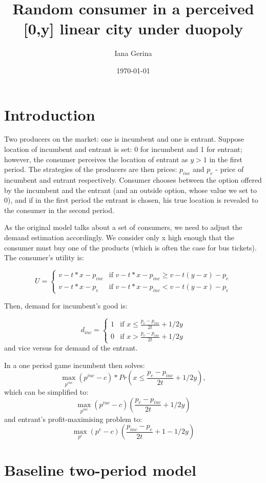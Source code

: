 \documentclass{article}
\title{Random consumer in a perceived [0,y] linear city under duopoly}
\author{Iana Gerina}
\date{\today}
\begin{document}
\maketitle


\section{Introduction}
Two producers on the market: one is incumbent and one is entrant. Suppose location of incumbent and entrant is set: 0 for incumbent and 1 for entrant; however, the consumer perceives the location of entrant as $y>1$ in the first period. The strategies of the producers are then prices: $p_{inc}$ and $p_{e}$ - price of incumbent and entrant respectively. Consumer chooses between the option offered by the incumbent and the entrant (and an outside option, whose value we set to 0), and if in the first period the entrant is chosen, his true location is revealed to the consumer in the second period.

As the original model talks about a set of consumers, we need to adjust the demand estimation accordingly. We consider only x high enough that the consumer must buy one of the products (which is often the case for bus tickets). The consumer's utility is:

    $$ U = \begin{cases}
    v - t*x - p_{inc} &  \text{if } v-t*x - p_{inc} \geq v - t(y-x) - p_{e}\\
    v - t*x - p_{e} &  \text{if } v-t*x - p_{inc} < v - t(y-x) - p_{e}
    \end{cases}
$$

Then, demand for incumbent's good is:

$$d_{inc} = \begin{cases}
    1 &  \text{if } x \leq \frac{p_{e}-p_{inc}}{2t} + 1/2y\\
    0 &  \text{if } x > \frac{p_{e}-p_{inc}}{2t} + 1/2y
    \end{cases}
$$
 and vice versus for demand of the entrant.
 
In a one period game incumbent then solves:
$$\max_{p^{inc}} (p^{inc}-c)* Pr(x \leq \frac{p_{e}-p_{inc}}{2t} + 1/2y),$$
which can be simplified to:
$$\max_{p^{inc}} (p^{inc}-c)(\frac{p_{e}-p_{inc}}{2t} + 1/2y)$$
and entrant's profit-maximising problem to:
$$\max_{p^{e}} (p^{e}-c)(\frac{p_{inc}-p_{e}}{2t} + 1 - 1/2y)$$

\section{Baseline two-period model}
    
\end{document}
